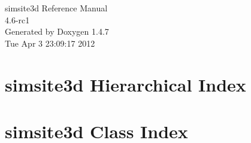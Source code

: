 \documentclass[a4paper]{book}
\begin{document}
\begin{titlepage}
\vspace*{7cm}
\begin{center}
{\Large simsite3d Reference Manual\\[1ex]\large 4.6-rc1 }\\
\vspace*{1cm}
{\large Generated by Doxygen 1.4.7}\\
\vspace*{0.5cm}
{\small Tue Apr 3 23:09:17 2012}\\
\end{center}
\end{titlepage}
\clearemptydoublepage
{}
\tableofcontents
\clearemptydoublepage
{}
\chapter{simsite3d Hierarchical Index}

\chapter{simsite3d Class Index}

\end{document}

